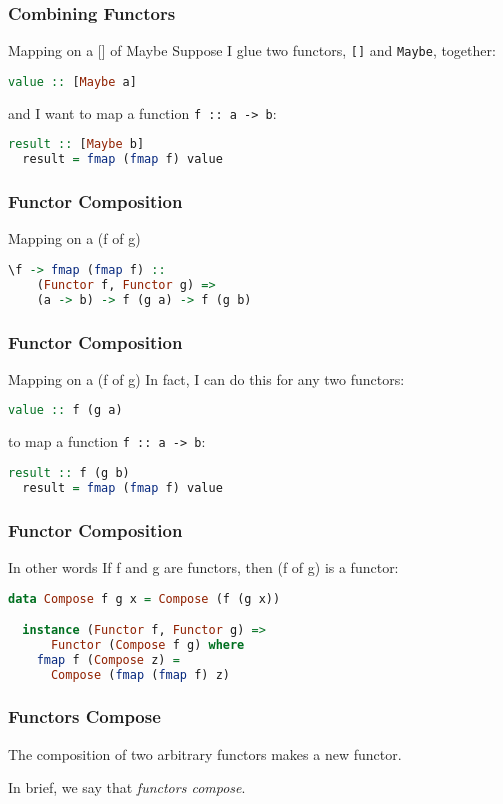 \begin{frame}[fragile]
\frametitle{Combining Functors}
\begin{block}{Mapping on a [] of Maybe}
Suppose I glue two functors, \lstinline$[]$ and \lstinline$Maybe$, together:
\begin{lstlisting}[language=haskell]
  value :: [Maybe a]
\end{lstlisting}
and I want to map a function \lstinline$f :: a -> b$:
\begin{lstlisting}[language=haskell]
  result :: [Maybe b]
  result = fmap (fmap f) value
\end{lstlisting}
\end{block}
\end{frame}

\begin{frame}[fragile]
\frametitle{Functor Composition}
\begin{block}{Mapping on a (f of g)}
\begin{lstlisting}[language=haskell]
  \f -> fmap (fmap f) ::
    (Functor f, Functor g) =>
    (a -> b) -> f (g a) -> f (g b)
\end{lstlisting}
\end{block}
\end{frame}

\begin{frame}[fragile]
\frametitle{Functor Composition}
\begin{block}{Mapping on a (f of g)}
In fact, I can do this for any two functors:
\begin{lstlisting}[language=haskell]
  value :: f (g a)
\end{lstlisting}
to map a function \lstinline$f :: a -> b$:
\begin{lstlisting}[language=haskell]
  result :: f (g b)
  result = fmap (fmap f) value
\end{lstlisting}
\end{block}
\end{frame}

\begin{frame}[fragile]
\frametitle{Functor Composition}
\begin{block}{In other words}
If f and g are functors, then (f of g) is a functor:
\begin{lstlisting}[language=haskell]
  data Compose f g x = Compose (f (g x))

  instance (Functor f, Functor g) =>
      Functor (Compose f g) where
    fmap f (Compose z) =
      Compose (fmap (fmap f) z)
\end{lstlisting}
\end{block}
\end{frame}

\begin{frame}
\frametitle{Functors Compose}
The composition of two arbitrary functors makes a new functor.

In brief, we say that \emph{functors compose}.
\end{frame}
